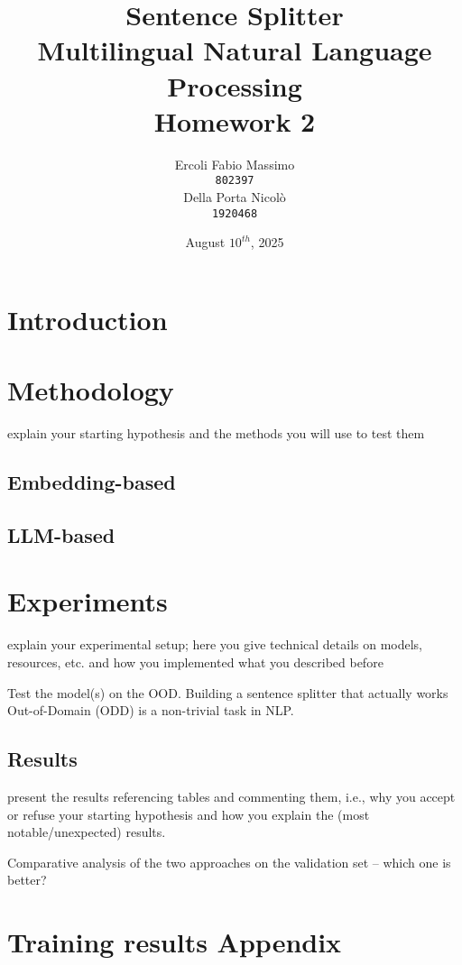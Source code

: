 \documentclass[11pt]{article}
\title{%
	Sentence Splitter\\
	\large Multilingual Natural Language Processing \\
	Homework 2}
\date{August $10^{th}$, 2025}
\author{Ercoli Fabio Massimo \\
\texttt{802397} \\\And
Della Porta Nicolò \\
\texttt{1920468} \\}
\begin{document}
\maketitle

\section{Introduction}

\section{Methodology}

explain your starting hypothesis and the methods you will use to test them

\subsection{Embedding-based}

\subsection{LLM-based}

\section{Experiments}

explain your experimental setup; here you give technical details on
models, resources, etc. and how you implemented what you described before

Test the model(s) on the OOD.
Building a sentence splitter that actually works Out-of-Domain (ODD) is a non-trivial task in NLP.

\subsection{Results}

present the results referencing tables and commenting them, i.e., why you
accept or refuse your starting hypothesis and how you explain the (most
notable/unexpected) results.

Comparative analysis of the two approaches on the validation set – which one is
better?

\appendix
\section{Training results Appendix}
\label{sec:appendix1}
\end{document}
